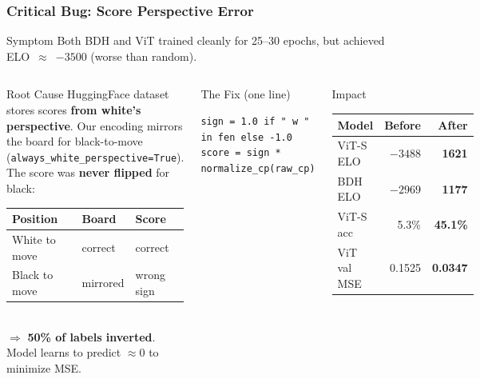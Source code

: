 \documentclass{beamer}
\begin{document}
\begin{frame}[fragile]
\frametitle{Critical Bug: Score Perspective Error}

\begin{alertblock}{Symptom}
Both BDH and ViT trained cleanly for 25--30 epochs, but achieved ELO~$\approx$~$-3500$ (worse than random).
\end{alertblock}

\vspace{0.4em}
\begin{columns}

\begin{block}{Root Cause}
\footnotesize
HuggingFace dataset stores scores \textbf{from white's perspective}. Our encoding mirrors the board for black-to-move (\texttt{always\_white\_perspective=True}).\\[0.4em]
The score was \textbf{never flipped} for black:\\[0.3em]
\begin{tabular}{lll}
\toprule
Position & Board & Score \\
\midrule
White to move & correct & correct \\
Black to move & mirrored & \alert{wrong sign} \\
\bottomrule
\end{tabular}\\[0.4em]
$\Rightarrow$ \textbf{50\% of labels inverted}. Model learns to predict $\approx 0$ to minimize MSE.
\end{block}


\begin{block}{The Fix (one line)}
\scriptsize
\begin{verbatim}
sign = 1.0 if " w " in fen else -1.0
score = sign * normalize_cp(raw_cp)
\end{verbatim}
\end{block}

\vspace{0.4em}
\begin{block}{Impact}
\footnotesize
\begin{tabular}{lrr}
\toprule
\textbf{Model} & \textbf{Before} & \textbf{After} \\
\midrule
ViT-S ELO   & $-3488$ & \textbf{1621}  \\
BDH ELO     & $-2969$ & \textbf{1177}  \\
ViT-S acc   & 5.3\%   & \textbf{45.1\%} \\
ViT val MSE & 0.1525  & \textbf{0.0347} \\
\bottomrule
\end{tabular}
\end{block}


\end{columns}
\end{frame}
\end{document}
